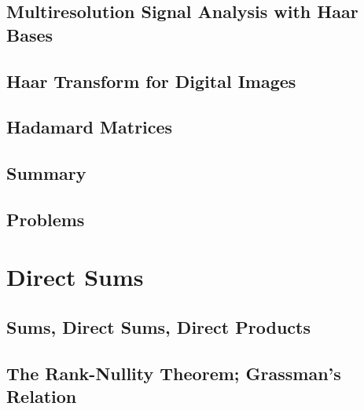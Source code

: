 \documentclass[a4paper]{article}
\begin{document}
\subsection{ Multiresolution Signal Analysis with Haar Bases} %

\subsection{ Haar Transform for Digital Images} %

\subsection{ Hadamard Matrices} %

\subsection{ Summary} %

\subsection{ Problems} %


\newpage
\section{Direct Sums}
\subsection{ Sums, Direct Sums, Direct Products} %

\subsection{ The Rank-Nullity Theorem; Grassman's Relation} %
\end{document}
